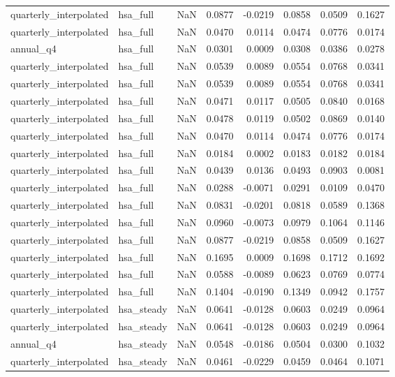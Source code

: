 \begin{tabular}{llrrrrrr}
quarterly\_interpolated & hsa\_full & NaN & 0.0877 & -0.0219 & 0.0858 & 0.0509 & 0.1627 \\
quarterly\_interpolated & hsa\_full & NaN & 0.0470 & 0.0114 & 0.0474 & 0.0776 & 0.0174 \\
annual\_q4 & hsa\_full & NaN & 0.0301 & 0.0009 & 0.0308 & 0.0386 & 0.0278 \\
quarterly\_interpolated & hsa\_full & NaN & 0.0539 & 0.0089 & 0.0554 & 0.0768 & 0.0341 \\
quarterly\_interpolated & hsa\_full & NaN & 0.0539 & 0.0089 & 0.0554 & 0.0768 & 0.0341 \\
quarterly\_interpolated & hsa\_full & NaN & 0.0471 & 0.0117 & 0.0505 & 0.0840 & 0.0168 \\
quarterly\_interpolated & hsa\_full & NaN & 0.0478 & 0.0119 & 0.0502 & 0.0869 & 0.0140 \\
quarterly\_interpolated & hsa\_full & NaN & 0.0470 & 0.0114 & 0.0474 & 0.0776 & 0.0174 \\
quarterly\_interpolated & hsa\_full & NaN & 0.0184 & 0.0002 & 0.0183 & 0.0182 & 0.0184 \\
quarterly\_interpolated & hsa\_full & NaN & 0.0439 & 0.0136 & 0.0493 & 0.0903 & 0.0081 \\
quarterly\_interpolated & hsa\_full & NaN & 0.0288 & -0.0071 & 0.0291 & 0.0109 & 0.0470 \\
quarterly\_interpolated & hsa\_full & NaN & 0.0831 & -0.0201 & 0.0818 & 0.0589 & 0.1368 \\
quarterly\_interpolated & hsa\_full & NaN & 0.0960 & -0.0073 & 0.0979 & 0.1064 & 0.1146 \\
quarterly\_interpolated & hsa\_full & NaN & 0.0877 & -0.0219 & 0.0858 & 0.0509 & 0.1627 \\
quarterly\_interpolated & hsa\_full & NaN & 0.1695 & 0.0009 & 0.1698 & 0.1712 & 0.1692 \\
quarterly\_interpolated & hsa\_full & NaN & 0.0588 & -0.0089 & 0.0623 & 0.0769 & 0.0774 \\
quarterly\_interpolated & hsa\_full & NaN & 0.1404 & -0.0190 & 0.1349 & 0.0942 & 0.1757 \\
quarterly\_interpolated & hsa\_steady & NaN & 0.0641 & -0.0128 & 0.0603 & 0.0249 & 0.0964 \\
quarterly\_interpolated & hsa\_steady & NaN & 0.0641 & -0.0128 & 0.0603 & 0.0249 & 0.0964 \\
annual\_q4 & hsa\_steady & NaN & 0.0548 & -0.0186 & 0.0504 & 0.0300 & 0.1032 \\
quarterly\_interpolated & hsa\_steady & NaN & 0.0461 & -0.0229 & 0.0459 & 0.0464 & 0.1071 \\

\end{tabular}
